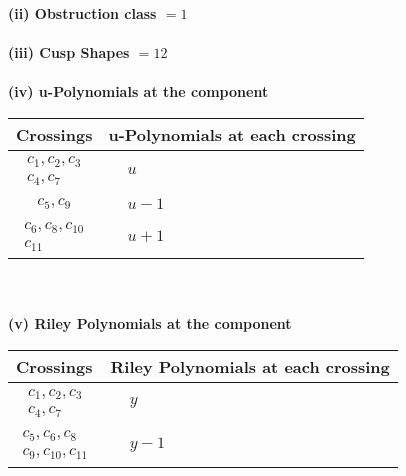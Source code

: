 \documentclass[1p]{elsarticle_modified}
\theoremstyle{definition}
\begin{document}
\flushleft \textbf{(ii) Obstruction class $= 1$}\\~\\
\flushleft \textbf{(iii) Cusp Shapes $= 12$}\\~\\
\newpage\renewcommand{\arraystretch}{1}
\flushleft \textbf{(iv) u-Polynomials at the component}\newline \\
\begin{tabular}{m{50pt}|m{274pt}}
Crossings & \hspace{64pt}u-Polynomials at each crossing \\
\hline $$\begin{aligned}c_{1},c_{2},c_{3}\\c_{4},c_{7}\end{aligned}$$&$\begin{aligned}
&u
\end{aligned}$\\
\hline $$\begin{aligned}c_{5},c_{9}\end{aligned}$$&$\begin{aligned}
&u-1
\end{aligned}$\\
\hline $$\begin{aligned}c_{6},c_{8},c_{10}\\c_{11}\end{aligned}$$&$\begin{aligned}
&u+1
\end{aligned}$\\
\hline
\end{tabular}\\~\\
\newpage\renewcommand{\arraystretch}{1}
\flushleft \textbf{(v) Riley Polynomials at the component}\newline \\
\begin{tabular}{m{50pt}|m{274pt}}
Crossings & \hspace{64pt}Riley Polynomials at each crossing \\
\hline $$\begin{aligned}c_{1},c_{2},c_{3}\\c_{4},c_{7}\end{aligned}$$&$\begin{aligned}
&y
\end{aligned}$\\
\hline $$\begin{aligned}c_{5},c_{6},c_{8}\\c_{9},c_{10},c_{11}\end{aligned}$$&$\begin{aligned}
&y-1
\end{aligned}$\\
\hline
\end{tabular}\\~\\
\end{document}

